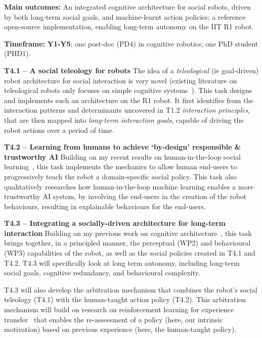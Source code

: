 \begin{oframed}
    \textbf{Main outcomes:} An integrated cognitive architecture for social
    robots, driven by both long-term social goals, and machine-learnt action
    policies; a reference open-source implementation, enabling long-term
    autonomy on the IIT R1 robot.

    \textbf{Timeframe:} \textbf{Y1-Y5}; one post-doc (PD4) in cognitive
    robotics; one PhD student (PHD1).

\end{oframed}

\textbf{T4.1 -- A social teleology for robots} The idea of a \emph{teleological}
(ie goal-driven) robot architecture for social interaction is very novel
(existing literature on teleological robots only focuses on simple cognitive
systems~\cite{oudeyer2005playground,forestier2017unified}). This task designs
and implements such an architecture on the R1 robot. It first identifies from
the interaction patterns and determinants uncovered in T1.2 \emph{interaction
principles}, that are then mapped into \emph{long-term interaction goals}, capable of
driving the robot actions over a period of time.

\textbf{T4.2 -- Learning from humans to achieve `by-design' responsible \&
trustworthy AI} Building on my recent results on human-in-the-loop social
learning~\cite{senft2017supervised,senft2019teaching,winkle2020couch}, this task
implements the mechanics to allow human end-users to progressively teach the
robot a domain-specific social policy.  This task also qualitatively researches
how human-in-the-loop machine learning enables a more trustworthy AI system, by
involving the end-users in the creation of the robot behaviours, resulting in
explainable behaviours for the end-users.

\textbf{T4.3 -- Integrating a socially-driven architecture for long-term
interaction} Building on my previous work on cognitive
architecture~\cite{lemaignan2017artificial}, this task brings together, in a
principled manner, the perceptual (WP2) and behavioural
(WP3) capabilities of the robot, as well as the social policies created in T4.1 and
T4.2. T4.3 will specifically look at long term autonomy, including long-term
social goals, cognitive redundancy, and behavioural complexity.

T4.3 will also develop the arbitration mechanism that combines the robot's
social teleology (T4.1) with the human-taught action policy (T4.2). This
arbitration mechanism will build on research on reinforcement learning for
experience transfer~\cite{madden2004transfer} that enables the re-assessment of
a policy (here, our intrinsic motivation) based on previous experience (here,
the human-taught policy).

